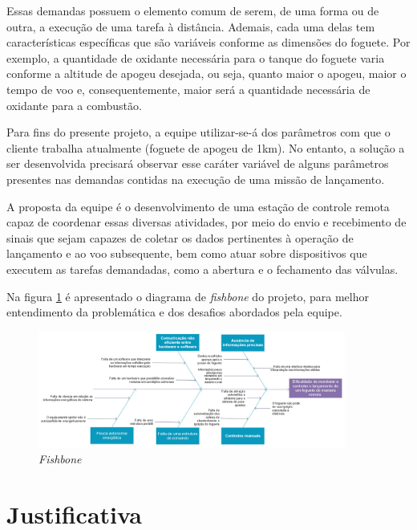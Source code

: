 \par Essas demandas possuem o elemento comum de serem, de uma forma ou de outra, a execução de uma tarefa à distância. Ademais, cada uma delas tem características específicas que são variáveis conforme as dimensões do foguete. Por exemplo, a quantidade de oxidante necessária para o tanque do foguete varia conforme a altitude de apogeu desejada, ou seja, quanto maior o apogeu, maior o tempo de voo e, consequentemente, maior será a quantidade necessária de oxidante para a combustão.

\par Para fins do presente projeto, a equipe utilizar-se-á dos parâmetros com que o cliente trabalha atualmente (foguete de apogeu de 1km). No entanto, a solução a ser desenvolvida precisará observar esse caráter variável de alguns parâmetros presentes nas demandas contidas na execução de uma missão de lançamento.

\par A proposta da equipe é o desenvolvimento de uma estação de controle remota capaz de coordenar essas diversas atividades, por meio do envio e recebimento de sinais que sejam capazes de coletar os dados pertinentes à operação de lançamento e ao voo subsequente, bem como atuar sobre dispositivos que executem as tarefas demandadas, como a abertura e o fechamento das válvulas.

\par Na figura \ref{fig:fishbone} é apresentado o diagrama de \textit{fishbone} do projeto, para melhor entendimento da problemática e dos desafios abordados pela equipe.

\begin{figure}[H]
\centering
\includegraphics[width=0.9\textwidth]{figuras/Fishbone}
\caption{\textit{Fishbone}}
\label{fig:fishbone}
\end{figure}

\section{Justificativa}

